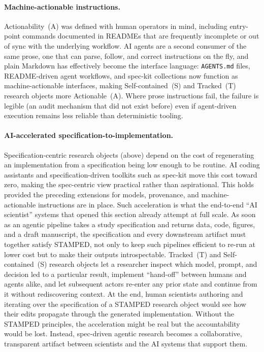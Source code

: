 \documentclass{article}
\begin{document}
\paragraph{Machine-actionable instructions.}
Actionability~(A) was defined with human operators in mind, including entry-point commands documented in READMEs that are frequently incomplete or out of sync with the underlying workflow.
AI agents are a second consumer of the same prose, one that can parse, follow, and correct instructions on the fly, and plain Markdown has effectively become the interface language: \texttt{AGENTS.md} files, README-driven agent workflows, and spec-kit\cite{github_spec_2025} collections now function as machine-actionable interfaces, making Self-contained~(S) and Tracked~(T) research objects more Actionable~(A).
Where prose instructions fail, the failure is legible (an audit mechanism that did not exist before) even if agent-driven execution remains less reliable than deterministic tooling.

\paragraph{AI-accelerated specification-to-implementation.}
Specification-centric research objects (above) depend on the cost of regenerating an implementation from a specification being low enough to be routine.
AI coding assistants and specification-driven toolkits such as spec-kit move this cost toward zero, making the spec-centric view practical rather than aspirational.
This holds provided the preceding extensions for models, provenance, and machine-actionable instructions are in place.
Such acceleration is what the end-to-end ``AI scientist'' systems that opened this section already attempt at full scale.
As soon as an agentic pipeline takes a study specification and returns data, code, figures, and a draft manuscript, the specification and every downstream artifact must together satisfy STAMPED, not only to keep such pipelines efficient to re-run at lower cost but to make their outputs introspectable.
Tracked~(T) and Self-contained~(S) research objects let a researcher inspect which model, prompt, and decision led to a particular result, implement ``hand-off'' between humans and agents alike, and let subsequent actors re-enter any prior state and continue from it without rediscovering context.
At the end, human scientists authoring and iterating over the specification of a STAMPED research object would see how their edits propagate through the generated implementation.
Without the STAMPED principles, the acceleration might be real but the accountability would be lost.
Instead, spec-driven agentic research becomes a collaborative, transparent artifact between scientists and the AI systems that support them.
\end{document}
